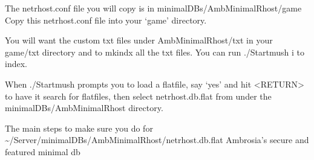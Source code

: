 \documentclass[letterpaper,10pt,english]{sphinxmanual}
\begin{document}
\sphinxAtStartPar
The netrhost.conf file you will copy is in minimal\sphinxhyphen{}DBs/Amb\sphinxhyphen{}MinimalRhost/game
Copy this netrhost.conf file into your ‘game’ directory.

\sphinxAtStartPar
You will want the custom txt files under Amb\sphinxhyphen{}MinimalRhost/txt in your game/txt directory and to mkindx all the txt files.  You can run ./Startmush \sphinxhyphen{}i to index.

\sphinxAtStartPar
When ./Startmush prompts you to load a flatfile, say ‘yes’ and hit \textless{}RETURN\textgreater{} to have it search for flatfiles, then select netrhost.db.flat from under the minimal\sphinxhyphen{}DBs/Amb\sphinxhyphen{}MinimalRhost directory.

\sphinxAtStartPar
The main steps to make sure you do for \textasciitilde{}/Server/minimal\sphinxhyphen{}DBs/Amb\sphinxhyphen{}MinimalRhost/netrhost.db.flat \textendash{} Ambrosia’s secure and featured minimal db
\end{document}
